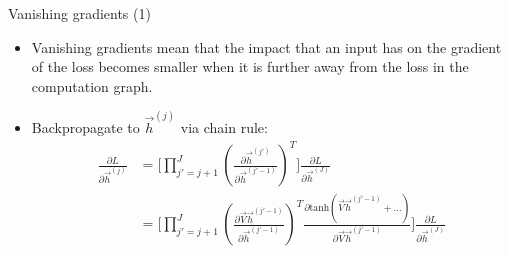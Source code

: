 \fi

\begin{vbframe}{Vanishing gradients (1)}

\vfill

\begin{itemize}
	\item Vanishing gradients mean that the impact that an input has on the gradient of the loss becomes smaller when it is further away from the loss in the computation graph.
\end{itemize}

\begin{itemize}
\item Backpropagate to $\vec h^{(j)}$ via chain rule:
$$
\begin{aligned}
\frac{\partial L}{\partial \vec h^{(j)}} & = \big[\prod_{j'=j+1}^{J} (\frac{\partial \vec h^{(j')}}{\partial \vec h^{(j'-1)}})^T\big] \frac{\partial L}{\partial \vec h^{(J)}} \\
& = \big[\prod_{j'=j+1}^{J} (\frac{\partial \vec V \vec h^{(j'-1)}}{\partial \vec h^{(j'-1)}})^T \frac{\partial \mathrm{tanh}(\vec V \vec h^{(j'-1)} + \ldots)}{\partial \vec V \vec h^{(j'-1)}} \big] \frac{\partial L}{\partial \vec h^{(J)}}
\end{aligned}
$$
\end{itemize}

\vfill

\end{vbframe}


